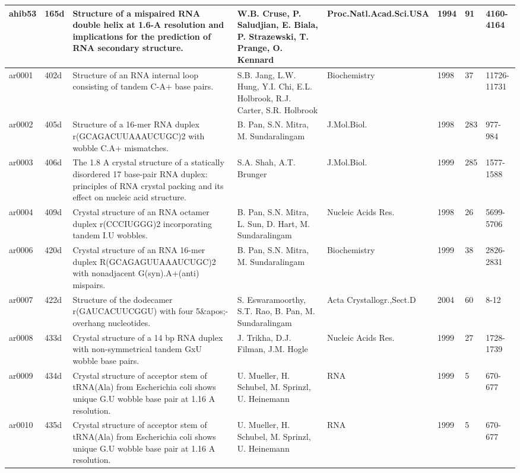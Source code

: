 {\begin{landscape}
\begin{center}
\begin{longtable}{p{0.76cm}   p{0.74cm}  p{5.2cm}   p{5.2cm}  p{3.2cm}
    p{0.6cm} p{0.9cm} p{1.8cm}}
ahib53 & 165d & Structure of a mispaired RNA double helix at 1.6-A resolution and implications for the prediction of RNA secondary structure. & W.B. Cruse, P. Saludjian, E. Biala, P. Strazewski, T. Prange, O. Kennard & Proc.Natl.Acad.Sci.USA & 1994 & 91 & 4160-4164 \\ \hline
ar0001 & 402d & Structure of an RNA internal loop consisting of tandem C-A+ base pairs. & S.B. Jang, L.W. Hung, Y.I. Chi, E.L. Holbrook, R.J. Carter, S.R. Holbrook & Biochemistry & 1998 & 37 & 11726-11731 \\ \hline
ar0002 & 405d & Structure of a 16-mer RNA duplex r(GCAGACUUAAAUCUGC)2 with wobble C.A+ mismatches. & B. Pan, S.N. Mitra, M. Sundaralingam & J.Mol.Biol. & 1998 & 283 & 977-984 \\ \hline
ar0003 & 406d & The 1.8 A crystal structure of a statically disordered 17 base-pair RNA duplex: principles of RNA crystal packing and its effect on nucleic acid structure. & S.A. Shah, A.T. Brunger & J.Mol.Biol. & 1999 & 285 & 1577-1588 \\ \hline
ar0004 & 409d & Crystal structure of an RNA octamer duplex r(CCCIUGGG)2 incorporating tandem I.U wobbles. & B. Pan, S.N. Mitra, L. Sun, D. Hart, M. Sundaralingam & Nucleic Acids Res. & 1998 & 26 & 5699-5706 \\ \hline
ar0006 & 420d & Crystal structure of an RNA 16-mer duplex R(GCAGAGUUAAAUCUGC)2 with nonadjacent G(syn).A+(anti) mispairs. & B. Pan, S.N. Mitra, M. Sundaralingam & Biochemistry & 1999 & 38 & 2826-2831 \\ \hline
ar0007 & 422d & Structure of the dodecamer r(GAUCACUUCGGU) with four 5\&apos;-overhang nucleotides. & S. Eswaramoorthy, S.T. Rao, B. Pan, M. Sundaralingam & Acta Crystallogr.,Sect.D & 2004 & 60 & 8-12 \\ \hline
ar0008 & 433d & Crystal structure of a 14 bp RNA duplex with non-symmetrical tandem GxU wobble base pairs. & J. Trikha, D.J. Filman, J.M. Hogle & Nucleic Acids Res. & 1999 & 27 & 1728-1739 \\ \hline
ar0009 & 434d & Crystal structure of acceptor stem of tRNA(Ala) from Escherichia coli shows unique G.U wobble base pair at 1.16 A resolution. & U. Mueller, H. Schubel, M. Sprinzl, U. Heinemann & RNA & 1999 & 5 & 670-677 \\ \hline
ar0010 & 435d & Crystal structure of acceptor stem of tRNA(Ala) from Escherichia coli shows unique G.U wobble base pair at 1.16 A resolution. & U. Mueller, H. Schubel, M. Sprinzl, U. Heinemann & RNA & 1999 & 5 & 670-677 \\ \hline

\end{longtable}
\end{center}
\end{landscape}}

